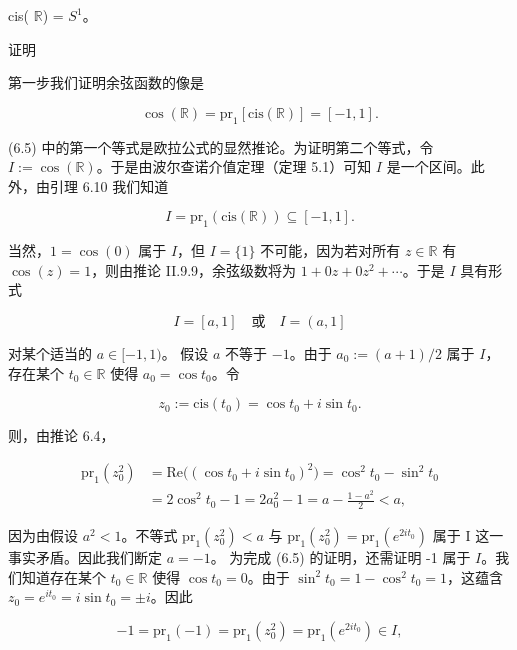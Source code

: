 \begin{lemma}

cis( $  \mathbb{R}  $) =  $  S^1  $。

证明

\begin{subitems}
\item

第一步我们证明余弦函数的像是

\begin{equation}
\cos(\mathbb{R})=\mathrm{p r}_{1}\left[\mathrm{c i s}(\mathbb{R})\right]=\left[-1,1\right].
\end{equation}

(6.5) 中的第一个等式是欧拉公式的显然推论。为证明第二个等式，令 $ I := \cos(\mathbb{R}) $。于是由波尔查诺介值定理（定理 5.1）可知 $ I $ 是一个区间。此外，由引理 6.10 我们知道

\[
I=\mathrm{p r}_{1}\left(\mathrm{c i s}(\mathbb{R})\right)\subseteq[-1,1].
\]

当然，$1 = \cos(0)$ 属于 $I$，但 $I = \{1\}$ 不可能，因为若对所有 $z \in \mathbb{R}$ 有 $\cos(z) = 1$，则由推论 II.9.9，余弦级数将为 $1 + 0z + 0z^2 + \cdots$。于是 $I$ 具有形式

\[
I=\left[a,1\right]\quad\text{或}\quad I=\left(a,1\right]
\]

对某个适当的 $ a \in [-1,1) $。
假设 $a$ 不等于 $-1$。由于 $a_0 := (a + 1)/2$ 属于 $I$，存在某个 $t_0 \in \mathbb{R}$ 使得 $a_0 = \cos t_0$。令

\[
z_{0}:=\mathrm{c i s}(t_{0})=\cos t_{0}+i\sin t_{0}.
\]

则，由推论 6.4，

\begin{equation*}
\begin{aligned}
\mathrm{pr}_{1}(z_{0}^{2})&=\mathrm{Re}\big((\cos t_{0}+i\sin t_{0})^{2}\big)=\cos^{2}t_{0}-\sin^{2}t_{0}\\&=2\cos^{2}t_{0}-1=2a_{0}^{2}-1=a-\frac{1-a^{2}}{2}<a,
\end{aligned}
\end{equation*}

因为由假设 $ a^{2} < 1 $。不等式 $ \mathrm{pr}_{1}(z_{0}^{2}) < a $ 与 $ \mathrm{pr}_{1}(z_{0}^{2}) = \mathrm{pr}_{1}(e^{2it_{0}}) $ 属于 I 这一事实矛盾。因此我们断定 $ a = -1 $。
为完成 (6.5) 的证明，还需证明 -1 属于 $I$。我们知道存在某个 $t_0 \in \mathbb{R}$ 使得 $\cos t_0 = 0$。由于 $\sin^2 t_0 = 1 - \cos^2 t_0 = 1$，这蕴含 $z_0 = e^{it_0} = i \sin t_0 = \pm i$。因此

\[
-1=\mathrm{pr}_{1}(-1)=\mathrm{pr}_{1}(z_{0}^{2})=\mathrm{pr}_{1}(e^{2i t_{0}})\in I,
\]


\end{subitems}
\end{lemma}
